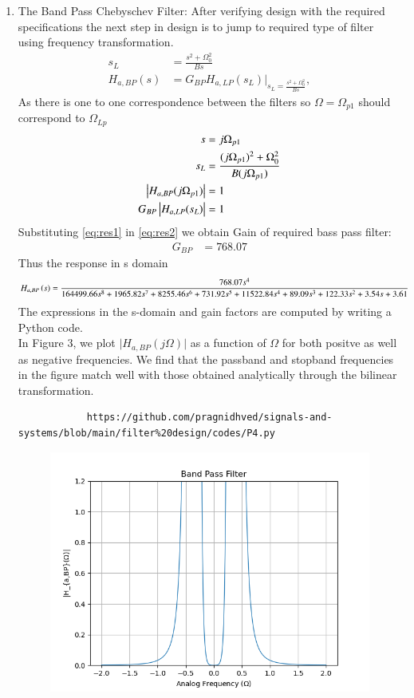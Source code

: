\documentclass{article}
\begin{document}
\begin{enumerate}
		\item {The Band Pass Chebyschev Filter:} 
		After verifying design with the required specifications the next step in design is to jump to required type of filter using frequency transformation. 
		\begin{align}
			s_L &= \frac{s^2 + \Omega_0^2}{Bs} \\
			H_{a,BP}(s) &= G_{BP}H_{a,LP}(s_L)\vert_{s_L = \frac{s^2 + \Omega_0^2}{Bs}},
		\end{align}
		As there is one to one correspondence between the filters so $\Omega=\Omega_{p1}$ should correspond to $\Omega_{Lp}$
		\begin{align}
			s &= j\Omega_{p1}\\
			s_{L} &= \frac{(j\Omega_{p1})^2 + \Omega_0^2}{B(j\Omega_{p1})} \label{eq:res1} \\ 
			\left\vert H_{a,BP}(j\Omega_{p1})\right\vert &= 1 \\
			G_{BP}\left\vert H_{a,LP}(s_L)\right\vert &= 1 \label{eq:res2}
		\end{align}
		Substituting \eqref{eq:res1} in \eqref{eq:res2} we obtain Gain of required bass pass filter:
		\begin{align}
			G_{BP} &= 768.07
		\end{align}
		Thus the response in s domain 
		\begin{align}
			H_{a,BP}\left(s\right) &= \frac{768.07s^4}{164499.66s^8 + 1965.82s^7 + 8255.46s^6 + 731.92s^5 + 11522.84s^4 + 89.09s^3 + 122.33s^2 + 3.54s + 3.61} \label{eq:magnitude_bandpass_sdom}
		\end{align}
		The expressions in the s-domain and gain factors are computed by writing a Python code. \\
		In Figure 3, we plot $\vert H_{a,BP}(j\Omega)\vert$ as a function of $\Omega$ for both positve as
		well as negative frequencies.  We find that the passband and stopband frequencies in the figure
		match well with those obtained analytically through the bilinear transformation.
		\begin{lstlisting}
			https://github.com/pragnidhved/signals-and-systems/blob/main/filter%20design/codes/P4.py
		\end{lstlisting}
		\begin{figure}[htbp]
			\centering
			\includegraphics[width=1\linewidth]{figs/fig4}

\end{figure}
\end{enumerate}
\end{document}
